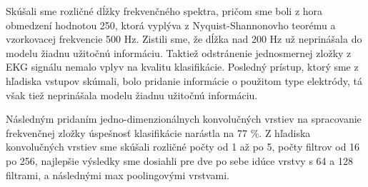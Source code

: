 Skúšali sme rozličné dĺžky frekvenčného spektra, pričom sme boli z hora obmedzení hodnotou 250, ktorá vyplýva z Nyquist-Shannonovho teorému a vzorkovacej frekvencie 500 Hz. Zistili sme, že dĺžka nad 200 Hz už neprinášala do modelu žiadnu užitočnú informáciu. Taktiež odstránenie jednosmernej zložky z EKG signálu nemalo vplyv na kvalitu klasifikácie. Posledný prístup, ktorý sme z hľadiska vstupov skúmali, bolo pridanie informácie o použitom type elektródy, tá však tiež neprinášala modelu žiadnu užitočnú informáciu.

Následným pridaním jedno-dimenzionálnych konvolučných vrstiev na spracovanie frekvenčnej zložky úspešnosť klasifikácie narástla na 77 \%. Z hľadiska konvolučných vrstiev sme skúšali rozličné počty od 1 až po 5, počty filtrov od 16 po 256, najlepšie výsledky sme dosiahli pre dve po sebe idúce vrstvy s 64 a 128 filtrami, a následnými max poolingovými vrstvami.

